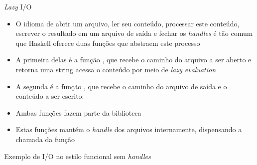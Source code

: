 \begin{frame}[fragile]{\textit{Lazy} I/O}

    \begin{itemize}
        \item O idioma de abrir um arquivo, ler seu conteúdo, processar este conteúdo, escrever
            o resultado em um arquivo de saída e fechar os \textit{handles} é tão comum que
            Haskell oferece duas funções que abstraem este processo

        \item A primeira delas é a função , que recebe o caminho do
            arquivo a ser aberto e retorna uma string acessa o conteúdo por meio de
            \textit{lazy evaluation}


        \item A segunda é a função , que recebe o caminho do arquivo de
            saída e o conteúdo a ser escrito:


        \item Ambas funções fazem parte da biblioteca 

        \item Estas funções mantém o \textit{handle} dos arquivos internamente, dispensando a
            chamada da função 
    \end{itemize}

\end{frame}

\begin{frame}[fragile]{Exemplo de I/O no estilo funcional sem \textit{handles}}
\end{frame}

